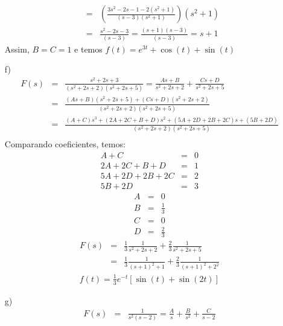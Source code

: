 \begin{resp}
\begin{itemize}
\begin{eqnarray*}
&=&\left(\frac{3s^2-2s-1-2(s^2+1)}{(s-3)(s^2+1)}\right)(s^2+1)\\
&=&\frac{s^2-2s-3}{(s-3)}=\frac{(s+1)(s-3)}{(s-3)}=s+1
\end{eqnarray*}
Assim, $B=C=1$ e temos
$f(t)=e^{3t}+\cos(t)+\sin(t)$
 \item [f)]
\begin{eqnarray*}
F(s)&=&\frac{s^2+2s+3}{(s^2+2s+2)(s^2+2s+5)}=\frac{As+B}{s^2+2s+2}+\frac{Cs+D}{s^2+2s+5}\\
&=&\frac{(As+B)(s^2+2s+5)+(Cs+D)(s^2+2s+2)}{(s^2+2s+2)(s^2+2s+5)}\\
&=&\frac{(A+C)s^3+(2A+2C+B+D)s^2+(5A+2D+2B+2C)s+(5B+2D)}{(s^2+2s+2)(s^2+2s+5)}\\
\end{eqnarray*}
Comparando coeficientes, temos:
\begin{eqnarray*}
A+C&=&0\\
2A+2C+B+D&=&1\\
5A+2D+2B+2C&=&2\\
5B+2D&=&3
\end{eqnarray*}
\begin{eqnarray*}
A&=&0  \\
B&=&\frac{1}{3}  \\
C&=& 0 \\
D&=&\frac{2}{3}  
\end{eqnarray*}
\begin{eqnarray*}
F(s)&=&\frac{1}{3}\frac{1}{s^2+2s+2}+\frac{2}{3}\frac{1}{s^2+2s+5}\\
&=&\frac{1}{3}\frac{1}{(s+1)^2+1}+\frac{2}{3}\frac{1}{(s+1)^2+2^2}
\end{eqnarray*}
\begin{eqnarray*}
f(t)=\frac{1}{3}e^{-t}\left[\sin(t)+\sin(2t)\right]
\end{eqnarray*}
 \item [g)]
\begin{eqnarray*}
F(s)&=&\frac{1}{s^2(s-2)}=\frac{A}{s}+\frac{B}{s^2}+\frac{C}{s-2}
\end{eqnarray*}
\end{itemize}
\end{resp}
